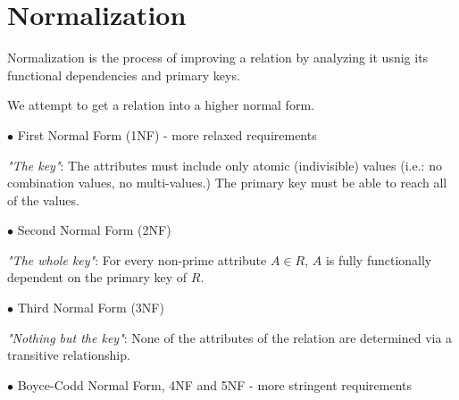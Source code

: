 \documentclass[english]{exam}
\begin{document}
	
    \section{Normalization}
    
    Normalization is the process of improving a relation by analyzing it usnig its functional dependencies and primary keys.
    
    We attempt to get a relation into a higher normal form.
    
    $\bullet$ First Normal Form (1NF) - more relaxed requirements
    
    \textit{"The key"}: The attributes must include only atomic (indivisible) values (i.e.: no combination values, no multi-values.) The primary key must be able to reach all of the values.
    
    $\bullet$ Second Normal Form (2NF)
    
    \textit{"The whole key"}: For every non-prime attribute $A \in R$, $A$ is fully functionally dependent on the primary key of $R$.
    
    $\bullet$ Third Normal Form (3NF)
    
    \textit{"Nothing but the key"}: None of the attributes of the relation are determined via a transitive relationship.
    
    $\bullet$ Boyce-Codd Normal Form, 4NF and 5NF - more stringent requirements
     
\end{document}
